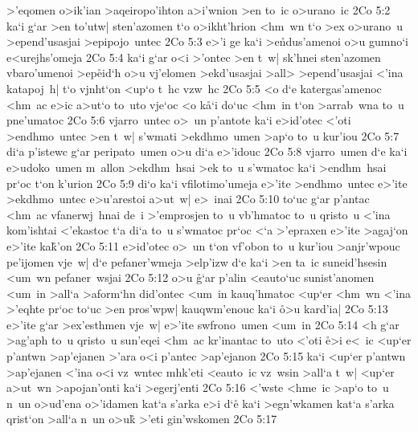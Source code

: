 >'eqomen
o>ik'ian
>aqeiropo'ihton
a>i'wnion
>en
to~ic
o>urano~ic\bibvsend
\vs 2Co 5:2
ka`i
g`ar
>en
to'utw|
sten'azomen
t`o
o>ikht'hrion
<hm~wn
t`o
>ex
o>urano~u
>epend'usasjai
>epipojo~untec\bibvsend
\vs 2Co 5:3
e>'i
ge
ka`i
>e\r{n}dus'amenoi
o>u
gumno`i
e<urejhs'omeja\bibvsend
\vs 2Co 5:4
ka`i
g`ar
o<i
>'ontec
>en
t~w|
sk'hnei
sten'azomen
vbaro'umenoi
>ep\r{e}id`h
o>u
vj'elomen
>ekd'usasjai
>all>
>epend'usasjai
<'ina
katapoj~h|
t`o
vjnht`on
<up`o
t~hc
vzw~hc\bibvsend
\vs 2Co 5:5
<o
d`e
katergas'amenoc
<hm~ac
e>ic
a>ut`o
to~uto
vje`oc
<o
k\r{a}`i
do`uc
<hm~in
t`on
>arrab~wna
to~u
pne'umatoc\bibvsend
\vs 2Co 5:6
vjarro~untec
o>~un
p'antote
ka`i
e>id'otec
<'oti
>endhmo~untec
>en
t~w|
s'wmati
>ekdhmo~umen
>ap`o
to~u
kur'iou\bibvsend
\vs 2Co 5:7
di`a
p'istewc
g`ar
peripato~umen
o>u
di`a
e>'idouc\bibvsend
\vs 2Co 5:8
vjarro~umen
d`e
ka`i
e>udoko~umen
m~allon
>ekdhm~hsai
>ek
to~u
s'wmatoc
ka`i
>endhm~hsai
pr`oc
t`on
k'urion\bibvsend
\vs 2Co 5:9
di`o
ka`i
vfilotimo'umeja
e>'ite
>endhmo~untec
e>'ite
>ekdhmo~untec
e>u'arestoi
a>ut~w|
e>~inai\bibvsend
\vs 2Co 5:10
to`uc
g`ar
p'antac
<hm~ac
vfanerwj~hnai
de~i
>'emprosjen
to~u
vb'hmatoc
to~u
qristo~u
<'ina
kom'ishtai
<'ekastoc
t`a
di`a
to~u
s'wmatoc
pr`oc
<`a
>'epraxen
e>'ite
>agaj`on
e>'ite
ka\r{k}'on\bibvsend
{}
\vs 2Co 5:11
e>id'otec
o>~un
t`on
vf'obon
to~u
kur'iou
>anjr'wpouc
pe'ijomen
vje~w|
d`e
pefaner'wmeja
>elp'izw
d`e
ka`i
>en
ta~ic
suneid'hsesin
<um~wn
pefaner~wsjai\bibvsend
\vs 2Co 5:12
o>u
\r{g}`ar
p'alin
<eauto`uc
sunist'anomen
<um~in
>all`a
>aform`hn
did'ontec
<um~in
kauq'hmatoc
<up`er
<hm~wn
<'ina
>'eqhte
pr`oc
to`uc
>en
pros'wpw|
kauqwm'enouc
ka`i
\r{o}>u
kard'ia|\bibvsend
\vs 2Co 5:13
e>'ite
g`ar
>ex'esthmen
vje~w|
e>'ite
swfrono~umen
<um~in\bibvsend
\vs 2Co 5:14
<h
g`ar
>ag'aph
to~u
qristo~u
sun'eqei
<hm~ac
kr'inantac
to~uto
<'oti
\r{e}>i
e<~ic
<up`er
p'antwn
>ap'ejanen
>'ara
o<i
p'antec
>ap'ejanon\bibvsend
\vs 2Co 5:15
ka`i
<up`er
p'antwn
>ap'ejanen
<'ina
o<i
vz~wntec
mhk'eti
<eauto~ic
vz~wsin
>all`a
t~w|
<up`er
a>ut~wn
>apojan'onti
ka`i
>egerj'enti\bibvsend
\vs 2Co 5:16
<'wste
<hme~ic
>ap`o
to~u
n~un
o>ud'ena
o>'idamen
kat`a
s'arka
e>i
d`e\r{}
ka`i
>egn'wkamen
kat`a
s'arka
qrist`on
>all`a
n~un
o>uk\r{}
>'eti
gin'wskomen\bibvsend
\vs 2Co 5:17
